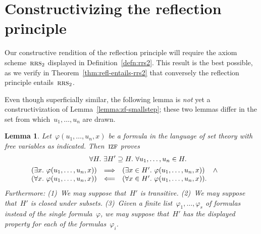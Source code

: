 \documentclass[oneside,reqno]{amsart}
\theoremstyle{definition}
\theoremstyle{plain}
\newtheorem{lemma}[defn]{Lemma}
\theoremstyle{remark}
\renewcommand{\_}{\mathpunct{.}\,}
\newcommand{\?}{\,{:}\,}
\newcommand{\IZF}{\textsc{izf}}
\newcommand{\RRS}{\textsc{rrs}}
\begin{document}


\section{Constructivizing the reflection principle}
\label{sect:constructive-proof}

Our constructive rendition of the reflection principle will require the axiom
scheme~$\RRS_2$ displayed in Definition~\ref{defn:rrs2}. This result is the
best possible, as we verify in Theorem~\ref{thm:refl-entails-rrs2} that
conversely the reflection principle entails~$\RRS_2$.

Even though superficially similar, the following lemma is \emph{not} yet a
constructivization of Lemma~\ref{lemma:zf-smallstep}; these two lemmas differ
in the set from which~$u_1,\ldots,u_n$ are drawn.

\begin{lemma}\label{lemma:izf-microstep}
Let~$\varphi(u_1,\ldots,u_n,x)$ be a formula in the language of set
theory with free variables as indicated. Then~$\IZF$ proves
\begin{multline*}
  {\qquad}\forall H\_
  \exists H' \supseteq H\_
  \forall u_1,\ldots,u_n \in H\_ \\
  \begin{array}{@{}rcl@{}}
  (\exists x\_ \varphi(u_1,\ldots,u_n,x)) &\Longrightarrow&
  (\exists x \in H'\_ \varphi(u_1,\ldots,u_n,x)) \quad\mathop{\wedge} \\
  (\forall x\_ \varphi(u_1,\ldots,u_n,x)) &\Longleftarrow&
  (\forall x \in H'\_ \varphi(u_1,\ldots,u_n,x)).\end{array}
  {\qquad}
\end{multline*}
Furthermore: (1)~We may suppose that~$H'$ is transitive. (2)~We may suppose
that~$H'$ is closed under subsets. (3)~Given a finite
list~$\varphi_1,\ldots,\varphi_s$ of formulas instead of the single
formula~$\varphi$, we may suppose that~$H'$ has the displayed property for each
of the formulas~$\varphi_i$.
\end{lemma}
\end{document}
